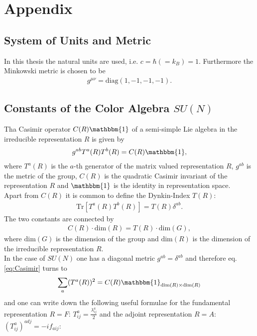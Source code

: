 \section{Appendix}


\subsection{System of Units and Metric}
In this thesis the natural units are used, i.e. $c= \hbar (= k_B) = 1$. Furthermore the Minkowski metric is chosen to be
\begin{align}
g^{\mu\nu} = \mathrm{diag}(1, -1, -1, -1).
\end{align}


\subsection{Constants of the Color Algebra $SU(N)$}\label{sec:coloralgebra}
Tha Casimir operator $C(R)\mathbbm{1}$ of a semi-simple Lie algebra in the irreducible representation $R$ is given by\cite{Marina}
\begin{align}
g^{ab} T^a(R)T^b(R) = C(R)\mathbbm{1}, \label{eq:Casimir}
\end{align}
where $T^a(R)$ is the $a$-th generator of the matrix valued representation $R$, $g^{ab}$ is the metric of the group, $C(R)$ is the quadratic Casimir invariant of the representation $R$ and $\mathbbm{1}$ is the identity in representation space.\\
Apart from $C(R)$ it is common to define the Dynkin-Index $T(R)$:
\begin{align}
\mathrm{Tr}\left[T^a(R)T^b(R)\right] = T(R)\delta^{ab}.
\end{align}
The two constants are connected by
\begin{align}
C(R) \cdot \mathrm{dim}(R) = T(R) \cdot \mathrm{dim}(G),
\end{align}
where $\mathrm{dim}(G)$ is the dimension of the group and $\mathrm{dim}(R)$ is the dimension of the irreducible representation $R$.\\
In the case of $SU(N)$ one has a diagonal metric $g^{ab} = \delta^{ab}$ and therefore eq. \ref{eq:Casimir} turns to
\begin{align}
\sum_a (T^a(R))^2 = C(R)\mathbbm{1}_{\mathrm{dim}(R) \times \mathrm{dim}(R)}
\end{align}
and one can write down the following useful formulae for the fundamental representation $R=F$: $T^a_{ij} = \frac{\lambda^a_{ij}}{2}$ and the adjoint representation $R=A$: $(T^a_{ij})^{adj} = -if_{aij}$:
